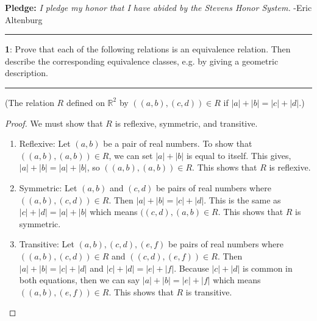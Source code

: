 \documentclass[11pt]{article}
\newcommand\question[2]{\vspace{.25in}\hrule\textbf{#1}: #2\vspace{.5em}\hrule\vspace{.10in}}
\renewcommand\part[1]{\vspace{.10in}(#1)\par}
\newcommand{\R}{\mathbb{R}}
\begin{document}
\raggedright
\newcommand\NAME{Eric Altenburg}  %
\newcommand\COURSE{MA-240}
\newcommand\HWNUM{6 Corrections}              %


\textbf{Pledge:} \textit{I pledge my honor that I have abided by the Stevens Honor System.} -Eric Altenburg

\question{1}{Prove that each of the following relations is an equivalence relation. Then describe the corresponding equivalence classes, e.g. by giving a geometric description.}

\part{The relation $R$ defined on $\R^2$ by $((a,b),(c,d)) \in R$ if $|a| + |b| = |c| + |d|.$}

\begin{proof}
	We must show that $R$ is reflexive, symmetric, and transitive.
	\begin{enumerate}
		\item Reflexive: Let $(a,b)$ be a pair of real numbers. To show that $((a,b),(a,b)) \in R$, we can set $|a|+|b|$ is equal to itself. This gives, $|a|+|b| = |a|+|b|$, so $((a,b),(a,b)) \in R$. This shows that $R$ is reflexive.

		\item Symmetric: Let $(a,b)$ and $(c,d)$ be pairs of real numbers where $((a,b),(c,d)) \in R$. Then $|a|+|b| = |c|+|d|$. This is the same as $|c| + |d| = |a| + |b|$ which means $((c,d),(a,b) \in R$. This shows that $R$ is symmetric. 

		\item Transitive: Let $(a,b),(c,d),(e,f)$ be pairs of real numbers where $((a,b),(c,d)) \in R$ and $((c,d),(e,f)) \in R$. Then $|a|+|b|=|c|+|d|$ and $|c|+|d| = |e| + |f|$. Because $|c|+|d|$ is common in both equations, then we can say $|a| +|b| = |e|+|f|$ which means $((a,b),(e,f)) \in R$. This shows that $R$ is transitive.
	\end{enumerate}
\end{proof}
\end{document}
